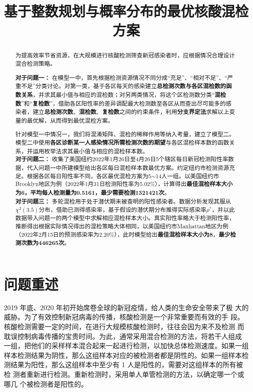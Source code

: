 \documentclass[withoutpreface,bwprint]{cumcmthesis} %
\title{\heiti \zihao{3}基于整数规划与概率分布的最优核酸混检方案}
\begin{document}
\maketitle
\begin{abstract}

为提高效率节省资源，在大规模进行核酸检测筛查新冠感染者时，应根据情况合理设计混合检测策略。

\textbf{对于问题一：}
在模型一中，首先根据检测资源情况不同分成“充足”、“相对不足”、“严重不足”分类讨论。对第一类，基于各区每天的感染建立\textbf{总检测次数与各区混检数的函数关系}，并求其最小值与相应的混检数；对另两类情况，将这个区检测数分类“\textbf{混检数}”和“\textbf{复检数}”，借助各区阳性率的差异调配最大检测数至各区从而查出尽可能多的感染者，建立\textbf{总检测次数}、\textbf{混检数}、\textbf{复检数}之间的约束条件，利用\textbf{分支界定法}求解以上变量的最优解，从而得到最优混检方案。 

针对模型一中情况一，我们将混淆矩阵、混检的稀释作用等纳入考量，建立了模型二。模型二中使用\textbf{各区诊断某一人感染情况所需检测次数的期望}与各区混检样本数的函数关系，并运用枚举法求其最小值与相应的混检样本数。\\

\textbf{对于问题二：} 
收集了美国纽约2022年1月26日至4月26日5个辖区每日新冠检测阳性率数据，代入问题一中所建模型给出各区每日混检样本数最优方案。约定纽约市检测资源充足。根据各区每日阳性率不同，各区最优混检方案为5$\sim$14人一组。以美国纽约市Brooklyn地区为例（2022年1月31日检测阳性率为5.02\%），计算得出\textbf{最佳混检样本大小为6，平均每人检测量为0.5161，最少需要检测1321421次}。\\

\textbf{对于问题三：} 
多轮混检用于处于潜伏期未被查明的阳性感染者。数据分析发现其服从$ \chi^2  \left(3.5\right)$分布\cite{wuhan}，借助已测得感染率，基于假设的潜伏期分布推得实际感染率$\rho^*$，并以此数据带入问题一的两个模型中求解相应混检样本大小。真实阳性率略大于检测阳性率，推断得出根据实际情况得出的混检策略大体相同，以美国纽约市Manhattan地区为例（2022年2月15日的预测感染率为2.20\%），此时模型给出\textbf{最佳混检样本大小为8}，\textbf{最少检测次数为446265次}。\\
\thispagestyle{empty}
\end{abstract}

\setcounter{page}{1}
\section{问题重述}
2019 年底、2020 年初开始席卷全球的新冠疫情，给人类的生命安全带来了极
大的威胁。为了有效控制新冠病毒的传播，核酸检测是一个非常重要而有效的手
段。核酸检测需要一定的时间，在进行大规模核酸检测时，往往会因为来不及检测
而耽误控制病毒传播的宝贵时间。为此，通常采用混合检测的方法，将若干人组成
一组，把他们的采样样本混合起来一起进行检测，以加快总体检测速度。如果一组
样本检测结果为阴性，那么这组样本对应的被检测者都是阴性的。如果一组样本检
测结果为阳性，那么这组样本中至少有 1 人是阳性的，需要对这组样本的所有被检
测者重新进行检测。重新检测时，采用单人单管检测的方法，以确定哪一个或哪几
个被检测者是阳性的。
\end{document}
